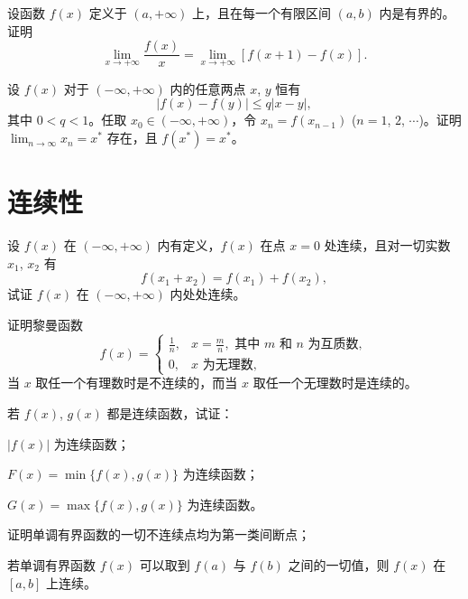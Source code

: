 	\begin{ti}
		设函数 $f(x)$ 定义于 $(a,+\infty)$ 上，且在每一个有限区间 $(a,b)$ 内是有界的。证明
		\[ \lim_{x \to +\infty} \frac{f(x)}{x} = \lim_{x \to +\infty} [f(x+1) - f(x)]. \]
	\end{ti}

	\begin{ti}
		设 $f(x)$ 对于 $(-\infty,+\infty)$ 内的任意两点 $x$, $y$ 恒有
		\[ |f(x) - f(y)| \leq q |x-y|, \]
		其中 $0<q<1$。任取 $x_0 \in (-\infty,+\infty)$，令 $x_n = f(x_{n-1})$ ($n=1$, $2$, $\cdots$)。证明 $\lim_{n \to \infty} x_n = x^*$ 存在，且 $f(x^*) = x^*$。
	\end{ti}

	\section{连续性}
	\begin{ti}
		设 $f(x)$ 在 $(-\infty,+\infty)$ 内有定义，$f(x)$ 在点 $x=0$ 处连续，且对一切实数 $x_1$, $x_2$ 有
		\[ f(x_1+x_2) = f(x_1) + f(x_2), \]
		试证 $f(x)$ 在 $(-\infty,+\infty)$ 内处处连续。
	\end{ti}

	\begin{ti}
		证明黎曼函数
		\[ f(x) = \begin{cases}
			\frac{1}{n}, & x=\frac{m}{n}, \text{ 其中 $m$ 和 $n$ 为互质数}, \\
			0, & x \text{ 为无理数},
		\end{cases} \]
		当 $x$ 取任一个有理数时是不连续的，而当 $x$ 取任一个无理数时是连续的。
	\end{ti}

	\begin{ti}
		若 $f(x)$, $g(x)$ 都是连续函数，试证：
		\begin{xiaoti}
			\item $|f(x)|$ 为连续函数；
			\item $F(x) = \min\{f(x),g(x)\}$ 为连续函数；
			\item $G(x) = \max\{f(x),g(x)\}$ 为连续函数。
		\end{xiaoti}
	\end{ti}

	\begin{ti}
		\begin{xiaoti}
			\item 证明单调有界函数的一切不连续点均为第一类间断点；
			\item 若单调有界函数 $f(x)$ 可以取到 $f(a)$ 与 $f(b)$ 之间的一切值，则 $f(x)$ 在 $[a,b]$ 上连续。
		\end{xiaoti}
	\end{ti}

